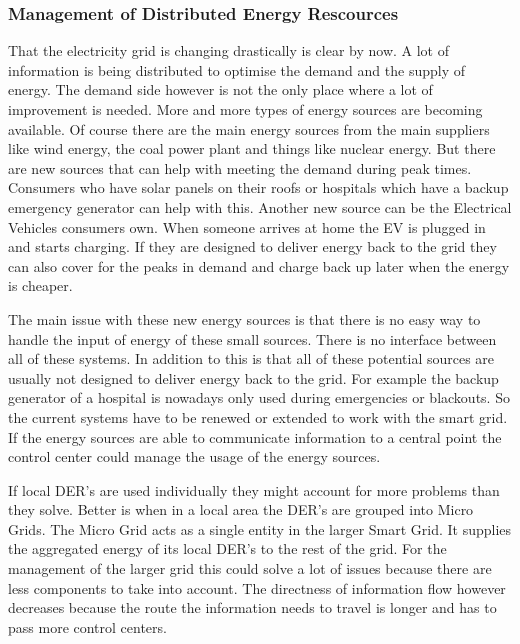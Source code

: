 \subsubsection{Management of Distributed Energy Rescources}
That the electricity grid is changing drastically is clear by now. A lot of information is being distributed to optimise the demand and the supply of energy. The demand side however is not the only place where a lot of improvement is needed. More and more types of energy sources are becoming available. Of course there are the main energy sources from the main suppliers like wind energy, the coal power plant and things like nuclear energy. But there are new sources that can help with meeting the demand during peak times. Consumers who have solar panels on their roofs or hospitals which have a backup emergency generator can help with this. \cite{Kumagai2012} Another new source can be the Electrical Vehicles consumers own. When someone arrives at home the EV is plugged in and starts charging. If they are designed to deliver energy back to the grid they can also cover for the peaks in demand and charge back up later when the energy is cheaper.

The main issue with these new energy sources is that there is no easy way to handle the input of energy of these small sources. There is no interface between all of these systems. In addition to this is that all of these potential sources are usually not designed to deliver energy back to the grid. For example the backup generator of a hospital is nowadays only used during emergencies or blackouts. So the current systems have to be renewed or extended to work with the smart  grid. If the energy sources are able to communicate information to a central point the control center could manage the usage of the energy sources. 

If local DER's are used individually they might account for more problems than they solve. Better is when in a local area the DER's are grouped into Micro Grids. The Micro Grid acts as a single entity in the larger Smart Grid. It supplies the aggregated energy of its local DER's to the rest of the grid. For the management of the larger grid this could solve a lot of issues because there are less components to take into account. The directness of information flow however decreases because the route the information needs to travel is longer and has to pass more control centers. 
